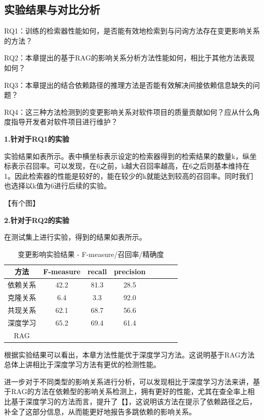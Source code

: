 \subsection{实验结果与对比分析}


RQ1：训练的检索器性能如何，是否能有效地检索到与问询方法存在变更影响关系的方法？

RQ2：本章提出的基于RAG的影响关系分析方法性能如何，相比于其他方法表现如何？

RQ3：本章提出的结合依赖路径的推理方法是否能有效解决间接依赖信息缺失的问题？

RQ4：这三种方法检测到的变更影响关系对软件项目的质量贡献如何？应从什么角度指导开发者对软件项目进行维护？

\textbf{1.针对于RQ1的实验}

实验结果如表所示。表中横坐标表示设定的检索器得到的检索结果的数量k，纵坐标表示召回率。可以发现，在6之前，k越大召回率越高，在6之后则基本维持在1。因此检索器的性能是较好的，能在较少的k就能达到较高的召回率。同时我们也选择以k值为6进行后续的实验。

【有个图】

\textbf{2.针对于RQ2的实验}

在测试集上进行实验，得到的结果如表所示。

\begin{table}[htbp]
\caption{变更影响实验结果 - F-measure/召回率/精确度}
\vspace{0.5em}\centering\wuhao
\begin{tabular}{cccccccc}
\toprule
方法 & F-measure & recall & precision  \\
\midrule
依赖关系 & 42.2 & 81.3 & 28.5  \\
克隆关系 & 6.4 & 3.3 &  92.0 \\
共现关系 & 62.1 & 68.7 & 56.6 \\
深度学习 & 65.2 & 69.4 & 61.4 \\
RAG &  &  &  \\
\bottomrule
\end{tabular}
\end{table}

根据实验结果可以看出，本章方法性能优于深度学习方法。这说明基于RAG方法总体上讲相比于深度学习方法有更优的检测性能。

进一步对于不同类型的影响关系进行分析，可以发现相比于深度学习方法来讲，基于RAG的方法在依赖型的影响关系检测上，拥有更好的性能，尤其在查全率上相比基于深度学习的方法而言，提升了【】，这说明该方法在提示了依赖路径之后，补全了这部分信息，从而能更好地报告多跳依赖的影响关系。


